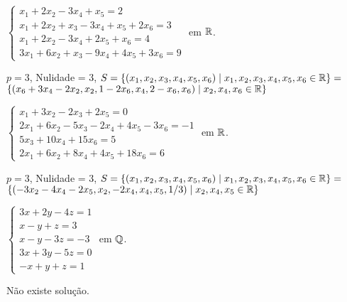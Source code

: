 \documentclass[12pt]{exam}
\begin{document}
\begin{exercicio}
  $
    \begin{cases}
      x_1 + 2x_2 - 3x_4 + x_5 = 2\\
      x_1 + 2x_2 + x_3 - 3x_4 + x_5 + 2x_6 = 3\\
      x_1 + 2x_2 - 3x_4 + 2x_5 + x_6 = 4\\
      3x_1 + 6x_2 + x_3 - 9x_4 + 4x_5 + 3x_6 = 9
    \end{cases}
  $
  em $\mathbb{R}$.
  \begin{solucao}
    $p = 3$, Nulidade = 3, $S = \{(x_1, x_2, x_3, x_4, x_5, x_6) \mid x_1, x_2, x_3, x_4, x_5, x_6 \in \mathbb{R}\} = $\\ $\{(x_6 + 3x_4 - 2x_2, x_2, 1 - 2x_6, x_4, 2 - x_6, x_6) \mid x_2, x_4, x_6 \in \mathbb{R}\}$
  \end{solucao}
\end{exercicio}

\begin{exercicio}
  $
    \begin{cases}
      x_1 + 3x_2 - 2x_3 + 2x_5 = 0\\
      2x_1 + 6x_2 - 5x_3 - 2x_4 + 4x_5 - 3x_6 = -1\\
      5x_3 + 10x_4 + 15x_6 = 5\\
      2x_1 + 6x_2 + 8x_4 + 4x_5 + 18x_6 = 6
    \end{cases}
  $
  em $\mathbb{R}$.
  \begin{solucao}
    $p = 3$, Nulidade = 3, $S = \{(x_1, x_2, x_3, x_4, x_5, x_6) \mid x_1, x_2, x_3, x_4, x_5, x_6 \in \mathbb{R}\} = $\\ $\{(-3x_2 - 4x_4 - 2x_5, x_2, -2x_4, x_4, x_5, 1/3) \mid x_2, x_4, x_5 \in \mathbb{R}\}$
  \end{solucao}
\end{exercicio}

\begin{exercicio}\label{sistema_linear_fim_gauss-jordan}
  $
    \begin{cases}
      3x + 2y - 4z = 1\\
      x - y + z = 3\\
      x - y - 3z = -3\\
      3x + 3y - 5z =0\\
      -x + y + z = 1
    \end{cases}
  $
  em $\mathbb{Q}$.
\begin{solucao}
  N\~ao existe solu\c{c}\~ao.
\end{solucao}
\end{exercicio}
\end{document}
